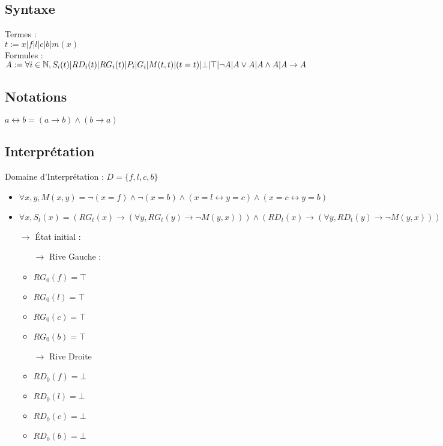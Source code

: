 \subsection{Syntaxe}
Termes : \\
$t := x|f|l|c|b|m(x)$ \\
Formules : \\
$A := \forall i \in\mathbb{N}, S_i(t)|RD_i(t)|RG_i(t)|P_i|G_i|M(t,t)|(t=t)| \bot|\top|\neg A|A\vee A|A\wedge A|A \rightarrow A$

\subsection{Notations}
$ a \leftrightarrow b = (a \rightarrow b) \wedge  (b \rightarrow a)$
\subsection{Interprétation}
Domaine d'Interprétation : $D = \{f,l,c,b\}$
\begin{itemize}
  \item $\forall x,y , M(x,y) = \neg(x=f) \wedge \neg(x=b) \wedge (x=l \leftrightarrow y=c) \wedge (x=c \leftrightarrow y=b)$
  \item $\forall x , S_t(x) = (RG_t(x) \to (\forall y , RG_t(y) \to \neg M(y,x) )) \wedge (RD_t(x) \to (\forall y , RD_t(y) \to \neg M(y,x) )) $
  \item[$ \to $] État initial :
    \begin{itemize}
      \item[$ \to $] Rive Gauche :
      \item $ RG_0(f) = \top $
      \item $ RG_0(l) = \top $
      \item $ RG_0(c) = \top $
      \item $ RG_0(b) = \top $
      \item[$ \to $] Rive Droite
      \item $ RD_0(f) = \bot $
      \item $ RD_0(l) = \bot $
      \item $ RD_0(c) = \bot $
      \item $ RD_0(b) = \bot $
    \end{itemize}

\end{itemize}


